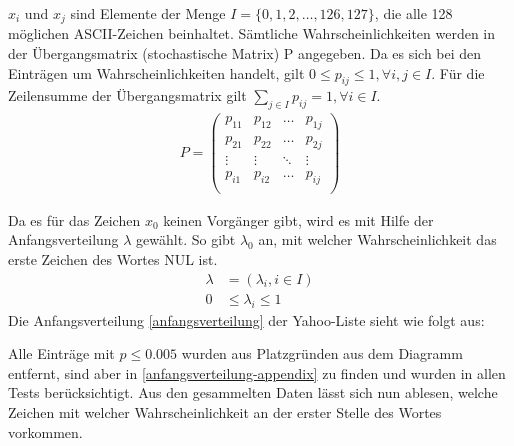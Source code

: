 \documentclass[12pt,a4paper]{scrartcl}
\newcommand{\spar}{\par\vspace{10pt}\noindent}
\numberwithin{equation}{section}
\numberwithin{myalgctr}{section}
\numberwithin{mytheoremctr}{section}
\begin{document}
	\noindent
	$x_i$ und $x_j$ sind Elemente der Menge $I=\lbrace0,1,2,\dots,126,127\rbrace$, die alle 128 möglichen ASCII-Zeichen beinhaltet. Sämtliche Wahrscheinlichkeiten werden in der Übergangsmatrix (stochastische Matrix) P angegeben. Da es sich bei den Einträgen um Wahrscheinlichkeiten handelt, gilt $0\leq p_{ij}\leq 1,\forall i,j\in I$. Für die Zeilensumme der Übergangsmatrix gilt $\sum_{j\in I}p_{ij} = 1,\forall i\in I$.
	\begin{align}
	P=
	\begin{pmatrix}
	p_{11} & p_{12} & \dots & p_{1j} \\
	p_{21} & p_{22} & \dots & p_{2j} \\
	\vdots & \vdots &\ddots & \vdots \\
	p_{i1} & p_{i2} & \dots & p_{ij} \\
	\end{pmatrix}
	\end{align}
	
	\spar
	Da es für das Zeichen $x_0$ keinen Vorgänger gibt, wird es mit Hilfe der Anfangsverteilung $\lambda$ gewählt. So gibt $\lambda_0$ an, mit welcher Wahrscheinlichkeit das erste Zeichen des Wortes NUL ist.\autocite[vgl.][S. 85 ff.]{markov}
	\begin{align}
	\lambda&=(\lambda_i,i\in I) \label{anfangsverteilung}\\
	0&\leq \lambda_i\leq 1
	\end{align}
	Die Anfangsverteilung \eqref{anfangsverteilung} der Yahoo-Liste sieht wie folgt aus:
	

	\noindent
	Alle Einträge mit $p\leq 0.005$ wurden aus Platzgründen aus dem Diagramm entfernt, sind aber in \cref{anfangsverteilung-appendix} zu finden und wurden in allen Tests berücksichtigt. Aus den gesammelten Daten lässt sich nun ablesen, welche Zeichen mit welcher Wahrscheinlichkeit an der erster Stelle des Wortes vorkommen.\\
	\par
\newpage
\end{document}
